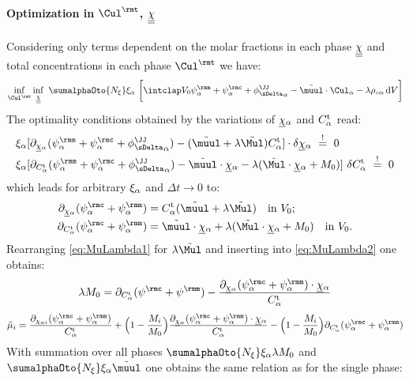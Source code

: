   \paragraph{Optimization in $\Ctul$, $\underline{\underline{\chi}}$} %
  Considering only terms dependent on the molar fractions in each phase $\underline{\underline{\chi}}$ and total concentrations in each phase $\Ctul$ we have:
  \begin{align}
    \inf_{\Ctul} \inf_{\chiull} \ \sumalphaOto{\Nxi} \xia \ \bigg[ \intVO  \psima + \psica + \phiJJDeltaa - \muultilde\cdot\Cula - \lambda\rho_{\circ\alpha} \dV \bigg]
    \label{eq:optchi2}
  \end{align}
  The optimality conditions obtained by the variations of $\smash{\underline{\chi}}_{\alpha}$ and $C^{\rm t}_{\alpha}$ read:
  \begin{align}
    & \xia [\dchiula(\psima+\psica+\phiJJDeltaa)-(\muultilde+\lambda\Multilde)\Cta] \cdot \delta\chiula \ \stackrel{!}{=} \ 0 \\
    & \xia [\dCta(\psima+\psica+\phiJJDeltaa)-\muultilde\cdot\chiula - \lambda(\Multilde\cdot\chiula + M_0 )] \ \delta\Cta \ \stackrel{!}{=} \ 0
  \end{align}
  which leads for arbitrary $\xi_\alpha$ and $\Delta t \rightarrow 0$ to:
  \begin{align}
    \dchiula(\psica+\psima) &= \Cta(\muultilde+\lambda\Multilde) \quad \text{in} \ V_0; 
    \label{eq:MuLambda1}\\
    \dCta(\psica+\psima) &= \muultilde\cdot\chiula+\lambda(\Multilde\cdot\chiula+M_0) \quad \text{in} \ V_0.
    \label{eq:MuLambda2}
  \end{align}
  Rearranging \cref{eq:MuLambda1} for $\lambda\tilde\Mul$ and inserting into \cref{eq:MuLambda2} one obtains:
  \begin{align}
    \lambda M_0 = \dCta(\psic+\psim) - \frac{\dchiula(\psica+\psima)\cdot\chiula}{\Cta}
  \end{align}
  \begin{align}
    \tilde\mu_i = \frac{\partial_{\chiai}(\psica+\psima)}{\Cta} + \Big(1-\frac{M_i}{M_0}\Big) \frac{\dchiula(\psica+\psima)\cdot\chiula}{\Cta} - \Big(1-\frac{M_i}{M_0}\Big) \dCta(\psica+\psima) 
  \end{align}
  With summation over all phases $\sumalphaOto{\Nxi}\xia \lambda M_0$ and $\sumalphaOto{\Nxi}\xia \muultilde$ one obtains the same relation as for the single phase:
